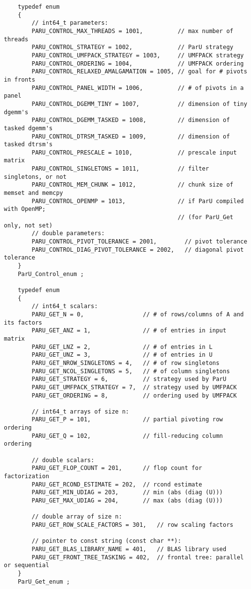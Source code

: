 \documentclass[12pt]{article}
\begin{document}
    {\footnotesize
    \begin{verbatim}
    typedef enum
    {
        // int64_t parameters:
        PARU_CONTROL_MAX_THREADS = 1001,          // max number of threads
        PARU_CONTROL_STRATEGY = 1002,             // ParU strategy
        PARU_CONTROL_UMFPACK_STRATEGY = 1003,     // UMFPACK strategy
        PARU_CONTROL_ORDERING = 1004,             // UMFPACK ordering
        PARU_CONTROL_RELAXED_AMALGAMATION = 1005, // goal for # pivots in fronts
        PARU_CONTROL_PANEL_WIDTH = 1006,          // # of pivots in a panel
        PARU_CONTROL_DGEMM_TINY = 1007,           // dimension of tiny dgemm's
        PARU_CONTROL_DGEMM_TASKED = 1008,         // dimension of tasked dgemm's
        PARU_CONTROL_DTRSM_TASKED = 1009,         // dimension of tasked dtrsm's
        PARU_CONTROL_PRESCALE = 1010,             // prescale input matrix
        PARU_CONTROL_SINGLETONS = 1011,           // filter singletons, or not
        PARU_CONTROL_MEM_CHUNK = 1012,            // chunk size of memset and memcpy
        PARU_CONTROL_OPENMP = 1013,               // if ParU compiled with OpenMP;
                                                  // (for ParU_Get only, not set)
        // double parameters:
        PARU_CONTROL_PIVOT_TOLERANCE = 2001,        // pivot tolerance
        PARU_CONTROL_DIAG_PIVOT_TOLERANCE = 2002,   // diagonal pivot tolerance
    }
    ParU_Control_enum ;

    typedef enum
    {
        // int64_t scalars:
        PARU_GET_N = 0,                 // # of rows/columns of A and its factors
        PARU_GET_ANZ = 1,               // # of entries in input matrix
        PARU_GET_LNZ = 2,               // # of entries in L
        PARU_GET_UNZ = 3,               // # of entries in U
        PARU_GET_NROW_SINGLETONS = 4,   // # of row singletons
        PARU_GET_NCOL_SINGLETONS = 5,   // # of column singletons
        PARU_GET_STRATEGY = 6,          // strategy used by ParU
        PARU_GET_UMFPACK_STRATEGY = 7,  // strategy used by UMFPACK
        PARU_GET_ORDERING = 8,          // ordering used by UMFPACK

        // int64_t arrays of size n:
        PARU_GET_P = 101,               // partial pivoting row ordering
        PARU_GET_Q = 102,               // fill-reducing column ordering

        // double scalars:
        PARU_GET_FLOP_COUNT = 201,      // flop count for factorization
        PARU_GET_RCOND_ESTIMATE = 202,  // rcond estimate
        PARU_GET_MIN_UDIAG = 203,       // min (abs (diag (U)))
        PARU_GET_MAX_UDIAG = 204,       // max (abs (diag (U)))

        // double array of size n:
        PARU_GET_ROW_SCALE_FACTORS = 301,   // row scaling factors

        // pointer to const string (const char **):
        PARU_GET_BLAS_LIBRARY_NAME = 401,   // BLAS library used
        PARU_GET_FRONT_TREE_TASKING = 402,  // frontal tree: parallel or sequential
    }
    ParU_Get_enum ; \end{verbatim}}
\end{document}
